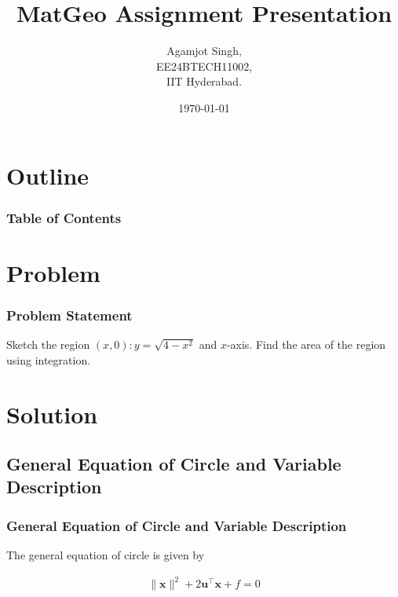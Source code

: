 \documentclass{beamer}
\title{MatGeo Assignment Presentation}
\author{Agamjot Singh,\\EE24BTECH11002,\\IIT Hyderabad.}
\date{\today}
\providecommand{\brak}[1]{\ensuremath{\left(#1\right)}}
\theoremstyle{remark}
\providecommand{\norm}[1]{\lVert#1\rVert}
\let\vec\mathbf
\numberwithin{equation}{section}
\begin{document}
\begin{frame}
\titlepage
\end{frame}

\section*{Outline}
\begin{frame}
\frametitle{Table of Contents}
\tableofcontents
\end{frame}

\section{Problem}

\begin{frame}
\frametitle{Problem Statement}
Sketch the region $\brak{x, 0} \colon y = \sqrt{4 - x^2}$ and $x$-axis. Find the area of the region using integration.
\end{frame}

\section{Solution}

\subsection{General Equation of Circle and Variable Description}
\begin{frame}
\frametitle{General Equation of Circle and Variable Description}

The general equation of circle is given by

\begin{align}
\label{eq:gen_eq_circle}
\norm{\vec{x}}^2 + 2\vec{u}^{\top}\vec{x} + f = 0
\end{align}

\begin{table}[h!]
	\centering
	
	\label{tab9.2.35}
\end{table}

\end{frame}

\end{document}
